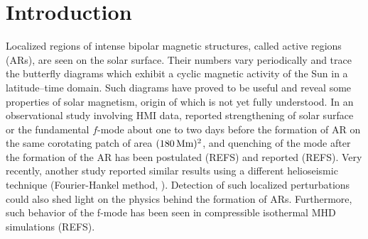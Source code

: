 \documentclass{aa}
\begin{document}

\maketitle

\section{Introduction} \label{sec:intro}

Localized regions of intense bipolar magnetic structures, called active regions
(ARs), are seen on the solar surface. Their numbers vary periodically and trace the
butterfly diagrams which exhibit a cyclic magnetic activity of the Sun in a latitude--time
domain. Such diagrams have proved to be useful and reveal some properties of solar
magnetism, origin of which is not yet fully understood.
In an observational study involving
HMI data, \cite{SRB16} reported strengthening of solar surface or the fundamental $f$-mode
about one to two days before
the formation of AR on the same corotating patch of area $(180\, \Mm)^2$,
and quenching of the mode after the formation of the AR has been postulated
(REFS) and reported (REFS).
Very recently, another study reported similar results using a different
helioseismic technique (Fourier-Hankel method, \cite{Waidele22}).
Detection of such localized perturbations
could also shed light
on the physics behind the formation of ARs.
Furthermore, such behavior of the f-mode has been seen in compressible
isothermal MHD simulations (REFS). 
\end{document}
